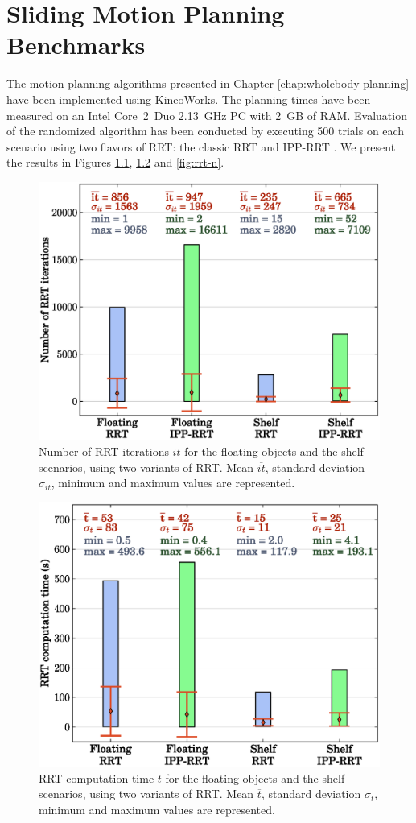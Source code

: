 \chapter{Sliding Motion Planning Benchmarks}
\label{chap:app-sliding}

The motion planning algorithms presented in Chapter
\ref{chap:wholebody-planning} have been implemented using
KineoWorks\texttrademark \cite{laumond2006kcs}. The planning times
have been measured on an Intel Core~2~Duo 2.13~GHz PC with 2~GB of
RAM. Evaluation of the randomized algorithm has been conducted by
executing 500 trials on each scenario using two flavors of RRT: the
classic RRT and IPP-RRT \cite{FERR04A}. We present the results in
Figures \ref{fig:rrt-it}, \ref{fig:rrt-t} and \ref{fig:rrt-n}.

\begin{figure}[h]
\centering
\includegraphics[width=0.7\linewidth]
                {src/appendix/plots/rrt-it.eps}
\caption{Number of RRT iterations $it$ for the floating objects and the
  shelf scenarios, using two variants of RRT. Mean $\overline{it}$,
  standard deviation $\sigma_{it}$, minimum and maximum values are
  represented.}
\label{fig:rrt-it}
\end{figure}

\begin{figure}
\centering
\includegraphics[width=0.7\linewidth]
                {src/appendix/plots/rrt-t.eps}
\caption{RRT computation time $t$ for the floating objects and the shelf
  scenarios, using two variants of RRT. Mean $\overline{t}$, standard
  deviation $\sigma_{t}$, minimum and maximum values are represented.}
\label{fig:rrt-t}
\end{figure}

